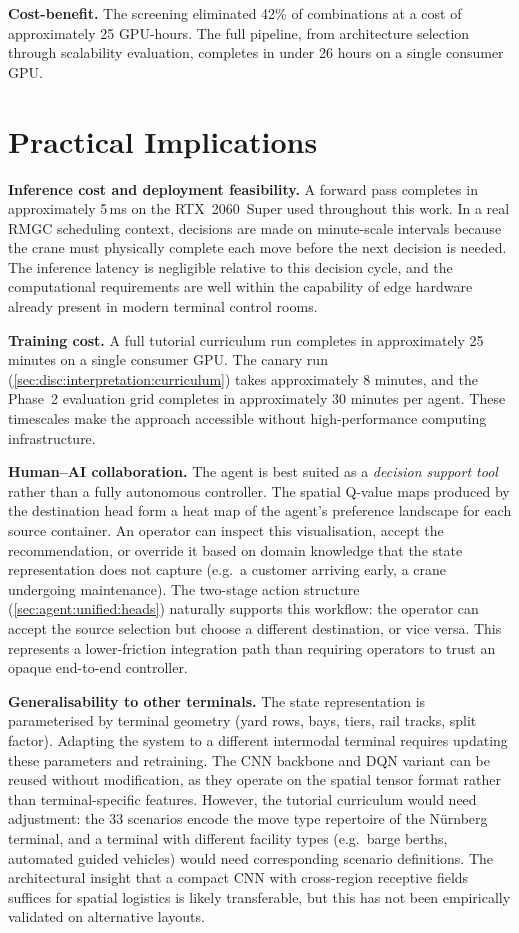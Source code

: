 \textbf{Cost-benefit.} The screening eliminated 42\% of combinations at a cost of approximately 25 GPU-hours. The full pipeline, from architecture selection through scalability evaluation, completes in under 26 hours on a single consumer GPU.

\section{Practical Implications}
\label{sec:disc:practical}

\textbf{Inference cost and deployment feasibility.}
A forward pass completes in approximately 5\,ms on the RTX~2060~Super used throughout this work. In a real RMGC scheduling context, decisions are made on minute-scale intervals because the crane must physically complete each move before the next decision is needed. The inference latency is negligible relative to this decision cycle, and the computational requirements are well within the capability of edge hardware already present in modern terminal control rooms.

\textbf{Training cost.}
A full tutorial curriculum run completes in approximately 25 minutes on a single consumer GPU. The canary run (\cref{sec:disc:interpretation:curriculum}) takes approximately 8 minutes, and the Phase~2 evaluation grid completes in approximately 30 minutes per agent. These timescales make the approach accessible without high-performance computing infrastructure.

\textbf{Human--AI collaboration.}
The agent is best suited as a \emph{decision support tool} rather than a fully autonomous controller. The spatial Q-value maps produced by the destination head form a heat map of the agent's preference landscape for each source container. An operator can inspect this visualisation, accept the recommendation, or override it based on domain knowledge that the state representation does not capture (e.g.\ a customer arriving early, a crane undergoing maintenance). The two-stage action structure (\cref{sec:agent:unified:heads}) naturally supports this workflow: the operator can accept the source selection but choose a different destination, or vice versa. This represents a lower-friction integration path than requiring operators to trust an opaque end-to-end controller.

\textbf{Generalisability to other terminals.}
The state representation is parameterised by terminal geometry (yard rows, bays, tiers, rail tracks, split factor). Adapting the system to a different intermodal terminal requires updating these parameters and retraining. The CNN backbone and DQN variant can be reused without modification, as they operate on the spatial tensor format rather than terminal-specific features. However, the tutorial curriculum would need adjustment: the 33 scenarios encode the move type repertoire of the N\"urnberg terminal, and a terminal with different facility types (e.g.\ barge berths, automated guided vehicles) would need corresponding scenario definitions. The architectural insight that a compact CNN with cross-region receptive fields suffices for spatial logistics is likely transferable, but this has not been empirically validated on alternative layouts.

